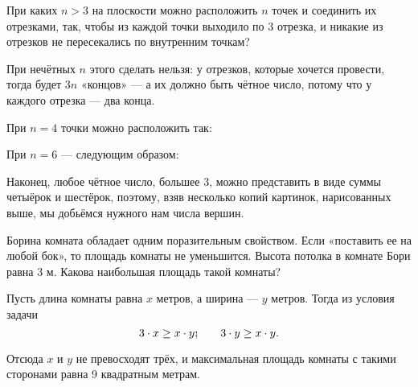 
\begin{itemize}

	\itB При каких $n>3$ на плоскости можно расположить $n$ точек и соединить их отрезками, так, чтобы из каждой точки выходило по 3 отрезка, и никакие из отрезков не пересекались по внутренним точкам?
	
	\itr При нечётных $n$ этого сделать нельзя: у отрезков, которые хочется провести, тогда будет $3n$ «концов» — а их должно быть чётное число, потому что у каждого отрезка — два конца.
	
	При $n=4$ точки можно расположить так:
	
	\begin{center}  \end{center}
	
	При $n=6$ — следующим образом:
	
	\begin{center}  \end{center}
	
	Наконец, любое чётное число, большее 3, можно представить в виде суммы четыёрок и шестёрок, поэтому, взяв несколько копий картинок, нарисованных выше, мы добьёмся нужного нам числа вершин.

\end{itemize}


\begin{itemize}

	\itA Борина комната обладает одним поразительным свойством. Если «поставить ее на любой бок», то площадь комнаты не уменьшится. Высота потолка в комнате Бори равна 3 м. Какова наибольшая площадь такой комнаты?
	
	\itr Пусть длина комнаты равна $x$ метров, а ширина — $y$ метров. Тогда из условия задачи
	$$3\cdot x \ge x \cdot y\scolon\qquad 3 \cdot y \ge x \cdot y.$$
	
	Отсюда $x$ и $y$ не превосходят трёх, и максимальная площадь комнаты с такими сторонами равна 9 квадратным метрам.

\end{itemize}

